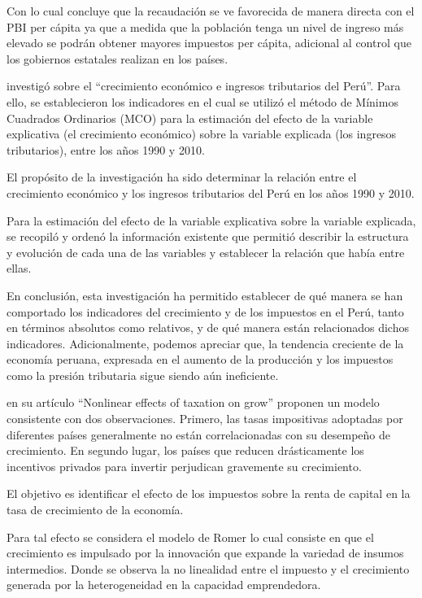 \documentclass[
  letterpaper,
]{article}
\begin{document}
Con lo cual concluye que la recaudación se ve favorecida de manera
directa con el PBI per cápita ya que a medida que la población tenga un
nivel de ingreso más elevado se podrán obtener mayores impuestos per
cápita, adicional al control que los gobiernos estatales realizan en los
países.

\textcite{ordonez_crecimiento_2014} investigó sobre el ``crecimiento
económico e ingresos tributarios del Perú''. Para ello, se establecieron
los indicadores en el cual se utilizó el método de Mínimos Cuadrados
Ordinarios (MCO) para la estimación del efecto de la variable
explicativa (el crecimiento económico) sobre la variable explicada (los
ingresos tributarios), entre los años 1990 y 2010.

El propósito de la investigación ha sido determinar la relación entre el
crecimiento económico y los ingresos tributarios del Perú en los años
1990 y 2010.

Para la estimación del efecto de la variable explicativa sobre la
variable explicada, se recopiló y ordenó la información existente que
permitió describir la estructura y evolución de cada una de las
variables y establecer la relación que había entre ellas.

En conclusión, esta investigación ha permitido establecer de qué manera
se han comportado los indicadores del crecimiento y de los impuestos en
el Perú, tanto en términos absolutos como relativos, y de qué manera
están relacionados dichos indicadores. Adicionalmente, podemos apreciar
que, la tendencia creciente de la economía peruana, expresada en el
aumento de la producción y los impuestos como la presión tributaria
sigue siendo aún ineficiente.

\textcite{jaimovich_nonlinear_2017} en su artículo ``Nonlinear effects
of taxation on grow'' proponen un modelo consistente con dos
observaciones. Primero, las tasas impositivas adoptadas por diferentes
países generalmente no están correlacionadas con su desempeño de
crecimiento. En segundo lugar, los países que reducen drásticamente los
incentivos privados para invertir perjudican gravemente su crecimiento.

El objetivo es identificar el efecto de los impuestos sobre la renta de
capital en la tasa de crecimiento de la economía.

Para tal efecto se considera el modelo de Romer lo cual consiste en que
el crecimiento es impulsado por la innovación que expande la variedad de
insumos intermedios. Donde se observa la no linealidad entre el impuesto
y el crecimiento generada por la heterogeneidad en la capacidad
emprendedora.
\end{document}
